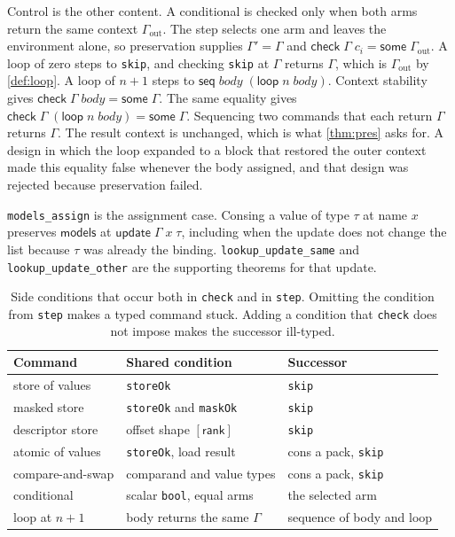 \documentclass[a4paper,UKenglish,anonymous,cleveref,autoref]{lipics-v2021}
\begin{document}
Control is the other content.
A conditional is checked only when both arms return the same context \(\Gamma_{\mathrm{out}}\).
The step selects one arm and leaves the environment alone, so preservation supplies \(\Gamma' = \Gamma\) and \(\mathsf{check}\;\Gamma\;c_i = \mathsf{some}\;\Gamma_{\mathrm{out}}\).
A loop of zero steps to \texttt{skip}, and checking \texttt{skip} at \(\Gamma\) returns \(\Gamma\), which is \(\Gamma_{\mathrm{out}}\) by \cref{def:loop}.
A loop of \(n{+}1\) steps to \(\mathsf{seq}\;\mathit{body}\;(\mathsf{loop}\;n\;\mathit{body})\).
Context stability gives \(\mathsf{check}\;\Gamma\;\mathit{body} = \mathsf{some}\;\Gamma\).
The same equality gives \(\mathsf{check}\;\Gamma\;(\mathsf{loop}\;n\;\mathit{body}) = \mathsf{some}\;\Gamma\).
Sequencing two commands that each return \(\Gamma\) returns \(\Gamma\).
The result context is unchanged, which is what \cref{thm:pres} asks for.
A design in which the loop expanded to a block that restored the outer context made this equality false whenever the body assigned, and that design was rejected because preservation failed.

\texttt{models\_assign} is the assignment case.
Consing a value of type \(\tau\) at name \(x\) preserves \(\mathsf{models}\) at \(\mathsf{update}\;\Gamma\;x\;\tau\), including when the update does not change the list because \(\tau\) was already the binding.
\texttt{lookup\_update\_same} and \texttt{lookup\_update\_other} are the supporting theorems for that update.

\begin{table}[t]
\caption{Side conditions that occur both in \texttt{check} and in \texttt{step}.
Omitting the condition from \texttt{step} makes a typed command stuck.
Adding a condition that \texttt{check} does not impose makes the successor ill-typed.}
\label{tab:side}
\begin{tabular}{@{}lll@{}}
\hline
Command & Shared condition & Successor \\
\hline
store of values & \texttt{storeOk} & \texttt{skip} \\
masked store & \texttt{storeOk} and \texttt{maskOk} & \texttt{skip} \\
descriptor store & offset shape \([\mathsf{rank}]\) & \texttt{skip} \\
atomic of values & \texttt{storeOk}, load result & cons a pack, \texttt{skip} \\
compare-and-swap & comparand and value types & cons a pack, \texttt{skip} \\
conditional & scalar \texttt{bool}, equal arms & the selected arm \\
loop at \(n{+}1\) & body returns the same \(\Gamma\) & sequence of body and loop \\
\hline
\end{tabular}
\end{table}
\end{document}
